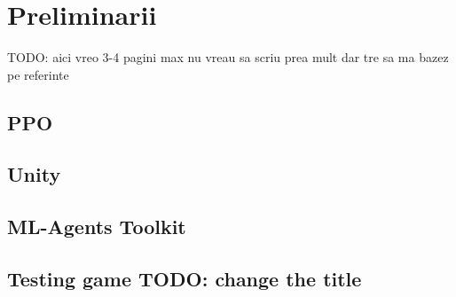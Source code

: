 \chapter{Preliminarii}


TODO: aici vreo 3-4 pagini max nu vreau sa scriu prea mult dar tre sa ma bazez pe referinte

\section{PPO}


\section{Unity}

\section{ML-Agents Toolkit}

\section{Testing game TODO: change the title}

